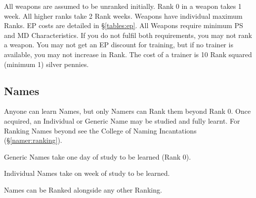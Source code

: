 \begin{multicols*}{3}
All weapons are assumed to be unranked initially.  Rank 0 in a weapon
takes 1 week.  All higher ranks take 2 \x Rank weeks. Weapons have
individual maximum Ranks.  EP costs are detailed in \S\ref{tables:ep}.
All Weapons require minimum PS and MD Characteristics. If you do not
fulfil both requirements, you may not rank a weapon.  You may not get
an EP discount for training, but if no trainer is available, you may
not increase in Rank.  The cost of a trainer is 10 \x Rank squared
(minimum 1) silver pennies.

\subsection{Names}

Anyone can learn Names, but only Namers can Rank them beyond Rank 0.
Once acquired, an Individual or Generic Name may be studied and fully
learnt. For Ranking Names beyond see the College of Naming
Incantations (\S\ref{namer:ranking}).

\begin{Itemize}
\item Generic Names take one day of study to be learned (\ie Rank 0).

\item Individual Names take on week of study to be learned.

\item Names can be Ranked alongside any other Ranking.
\end{Itemize}

\end{multicols*}
